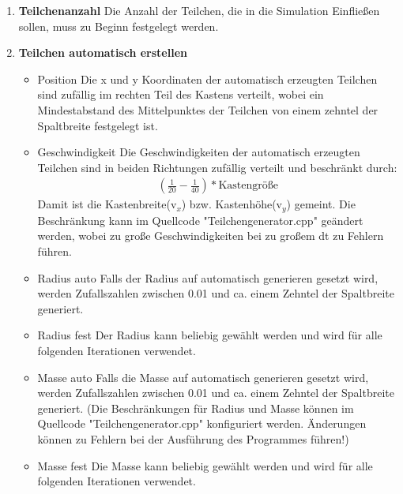 \documentclass[14pt,a4paper]{scrartcl}
\begin{document}
\begin{enumerate}

\item \textbf{Teilchenanzahl}
\newline
Die Anzahl der Teilchen, die in die Simulation Einfließen sollen, muss zu Beginn festgelegt werden.

\item \textbf{Teilchen automatisch erstellen}

\begin{itemize}

\item Position
\newline
Die x und y Koordinaten der automatisch erzeugten Teilchen sind zufällig im rechten Teil des Kastens verteilt, wobei ein Mindestabstand des Mittelpunktes der Teilchen von einem zehntel der Spaltbreite festgelegt ist.

\item Geschwindigkeit
\newline
Die Geschwindigkeiten der automatisch erzeugten Teilchen sind in beiden Richtungen zufällig verteilt und beschränkt durch:
\begin{align*}
(\frac{1}{20}-\frac{1}{40})*\text{Kastengröße}
\end{align*}
Damit ist die Kastenbreite(v$_x$) bzw. Kastenhöhe(v$_y$)
gemeint. Die Beschränkung kann im Quellcode "Teilchengenerator.cpp" geändert werden, wobei zu große Geschwindigkeiten bei zu großem dt zu Fehlern führen.
\item Radius auto
\newline
Falls der Radius auf automatisch generieren gesetzt wird, werden Zufallszahlen zwischen 0.01 und ca. einem Zehntel der Spaltbreite generiert.
\item Radius fest
\newline
Der Radius kann beliebig gewählt werden und wird für alle folgenden Iterationen verwendet.
\item Masse auto
\newline
Falls die Masse auf automatisch generieren gesetzt wird,
werden Zufallszahlen zwischen 0.01 und ca. einem Zehntel der Spaltbreite generiert. (Die Beschränkungen für Radius und Masse können im Quellcode "Teilchengenerator.cpp" konfiguriert werden.  Änderungen können zu Fehlern bei der Ausführung des Programmes führen!)
\item Masse fest
\newline
Die Masse kann beliebig gewählt werden und wird für alle folgenden Iterationen verwendet. 

\end{itemize}
\end{enumerate}
\end{document}

